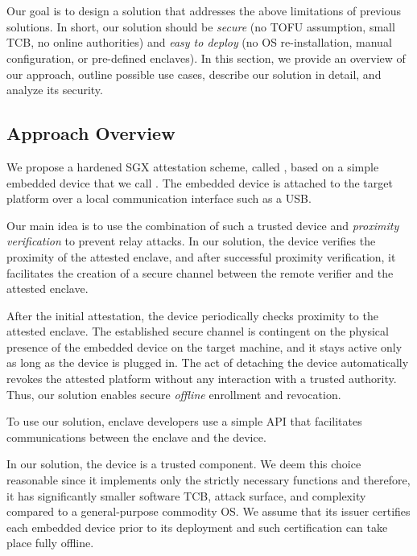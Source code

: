 \section{\name}
\label{sec:systemDesignMain}

Our goal is to design a solution that addresses the above limitations of previous solutions. In short, our solution should be \emph{secure} (no TOFU assumption, small TCB, no online authorities) and \emph{easy to deploy} (no OS re-installation, manual configuration, or pre-defined enclaves). In this section, we provide an overview of our approach, outline possible use cases, describe our solution in detail, and analyze its security.

\subsection{Approach Overview}

We propose a hardened SGX attestation scheme, called \name, based on a simple embedded device that we call \device. The embedded device is attached to the target platform over a local communication interface such as a USB. 


Our main idea is to use the combination of such a trusted device and \emph{proximity verification} to prevent relay attacks. In our solution, the \device device verifies the proximity of the attested enclave, and after successful proximity verification, it facilitates the creation of a secure channel between the remote verifier and the attested enclave. 

After the initial attestation, the device periodically checks proximity to the attested enclave. The established secure channel is contingent on the physical presence of the embedded device on the target machine, and it stays active only as long as the device is plugged in. The act of detaching the device automatically revokes the attested platform without any interaction with a trusted authority. Thus, our solution enables secure \emph{offline} enrollment and revocation. 

To use our solution, enclave developers use a simple API that facilitates communications between the enclave and the device. 


In our solution, the \device device is a trusted component. We deem this choice reasonable since it implements only the strictly necessary functions and therefore, it has significantly smaller software TCB, attack surface, and complexity compared to a general-purpose commodity OS. We assume that its issuer certifies each embedded device prior to its deployment and such certification can take place fully offline.

